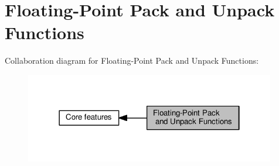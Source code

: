 \hypertarget{group__core__func__packing}{}\section{Floating-\/\+Point Pack and Unpack Functions}
\label{group__core__func__packing}
Collaboration diagram for Floating-\/\+Point Pack and Unpack Functions\+:
\nopagebreak
\begin{figure}[H]
\begin{center}
\leavevmode
\includegraphics[width=310pt]{d2/d2e/group__core__func__packing}
\end{center}
\end{figure}
